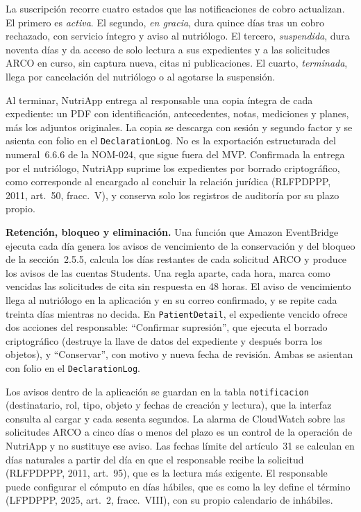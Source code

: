 \documentclass[12pt, a4paper]{article}
\begin{document}
La suscripción recorre cuatro estados que las notificaciones de cobro
actualizan. El primero es \textit{activa}. El segundo, \textit{en
gracia}, dura quince días tras un cobro rechazado, con servicio íntegro
y aviso al nutriólogo. El tercero, \textit{suspendida}, dura noventa
días y da acceso de solo lectura a sus expedientes y a las solicitudes
ARCO en curso, sin captura nueva, citas ni publicaciones. El cuarto,
\textit{terminada}, llega por cancelación del nutriólogo o al agotarse
la suspensión.

Al terminar, NutriApp entrega al responsable una copia íntegra de cada
expediente: un PDF con identificación, antecedentes, notas, mediciones y
planes, más los adjuntos originales. La copia se descarga con sesión y
segundo factor y se asienta con folio en el \texttt{DeclarationLog}. No
es la exportación estructurada del numeral~6.6.6 de la NOM-024, que
sigue fuera del MVP. Confirmada la entrega por el nutriólogo, NutriApp
suprime los expedientes por borrado criptográfico, como corresponde al
encargado al concluir la relación jurídica (RLFPDPPP, 2011, art.~50,
fracc.~V), y conserva solo los registros de auditoría por su plazo
propio.
 
\textbf{Retención, bloqueo y eliminación.} Una función que Amazon
EventBridge ejecuta cada día genera los avisos de vencimiento de la
conservación y del bloqueo de la sección~2.5.5, calcula los días
restantes de cada solicitud ARCO y produce los avisos de las cuentas
Students. Una regla aparte, cada hora, marca como vencidas las
solicitudes de cita sin respuesta en 48 horas. El aviso de vencimiento
llega al nutriólogo en la aplicación y en su correo confirmado, y se
repite cada treinta días mientras no decida. En \texttt{PatientDetail},
el expediente vencido ofrece dos acciones del responsable: ``Confirmar
supresión'', que ejecuta el borrado criptográfico (destruye la llave de datos del expediente y después borra los objetos), y ``Conservar'', con
motivo y nueva fecha de revisión. Ambas se asientan con folio en el
\texttt{DeclarationLog}.

Los avisos dentro de la aplicación se guardan en la tabla
\texttt{notificacion} (destinatario, rol, tipo, objeto y fechas de
creación y lectura), que la interfaz consulta al cargar y cada sesenta
segundos. La alarma de CloudWatch sobre las solicitudes ARCO a cinco
días o menos del plazo es un control de la operación de NutriApp y no
sustituye ese aviso. Las fechas límite del artículo~31 se calculan en
días naturales a partir del día en que el responsable recibe la
solicitud (RLFPDPPP, 2011, art.~95), que es la lectura más exigente. El
responsable puede configurar el cómputo en días hábiles, que es como
la ley define el término (LFPDPPP, 2025, art.~2, fracc.~VIII), con su
propio calendario de inhábiles.
\end{document}

